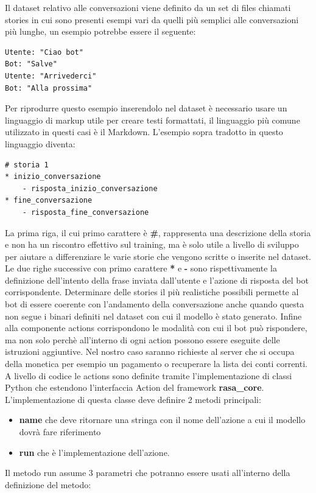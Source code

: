 Il dataset relativo alle conversazioni viene definito da un set di files chiamati stories in cui sono presenti esempi vari da quelli più semplici alle conversazioni più lunghe, un esempio potrebbe essere il seguente:
\begin{lstlisting}
Utente: "Ciao bot"
Bot: "Salve"
Utente: "Arrivederci"
Bot: "Alla prossima"
\end{lstlisting}
Per riprodurre questo esempio inserendolo nel dataset è necessario usare un linguaggio di markup utile per creare testi formattati, il linguaggio più comune utilizzato in questi casi è il Markdown. L'esempio sopra tradotto in questo linguaggio diventa:
\begin{lstlisting}
# storia 1
* inizio_conversazione
    - risposta_inizio_conversazione
* fine_conversazione
    - risposta_fine_conversazione
\end{lstlisting}
La prima riga, il cui primo carattere è \textbf{\#}, rappresenta una descrizione della storia e non ha un riscontro effettivo sul training, ma è solo utile a livello di sviluppo per aiutare a differenziare le varie storie che vengono scritte o inserite nel dataset.
Le due righe successive con primo carattere \textbf{*} e \textbf{-} sono rispettivamente la definizione dell'intento della frase inviata dall'utente e l'azione di risposta del bot corrispondente.
Determinare delle stories il più realistiche possibili permette al bot di essere coerente con l'andamento della conversazione anche quando questa non segue i binari definiti nel dataset con cui il modello è stato generato.
Infine alla componente actions corrispondono le modalità con cui il bot può rispondere, ma non solo perchè all'interno di ogni action possono essere eseguite delle istruzioni aggiuntive. Nel nostro caso saranno richieste al server che si occupa della monetica per esempio un pagamento o recuperare la lista dei conti correnti.
A livello di codice le actions sono definite tramite l'implementazione di classi Python che estendono l'interfaccia Action del framework \textbf{rasa\_core}.
L'implementazione di questa classe deve definire 2 metodi principali: 
\begin{itemize}
    \item \textbf{name} che deve ritornare una stringa con il nome dell'azione a cui il modello dovrà fare riferimento 
    \item \textbf{run} che è l'implementazione dell'azione.
\end{itemize}
Il metodo run assume 3 parametri che potranno essere usati all'interno della definizione del metodo: 
